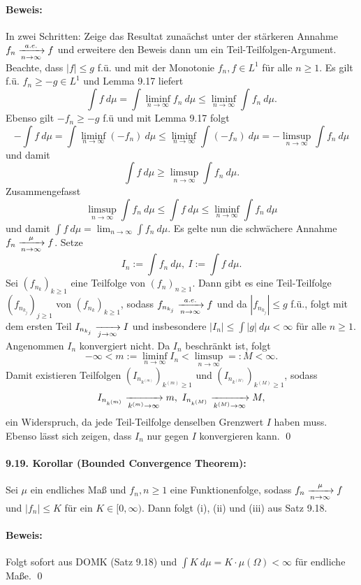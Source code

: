 \paragraph{Beweis:}In zwei Schritten: Zeige das Resultat zuna\"achst unter der st\"arkeren Annahme $f_n\nto{a.e.}{n\to\infty}f$ und erweitere den Beweis dann um ein Teil-Teilfolgen-Argument. Beachte, dass $|f|\leq g$ f.\"u. und mit der Monotonie $f_n,f\in L^1$ f\"ur alle $n\geq1$. Es gilt f.\"u. $f_n\geq -g\in L^1$ und Lemma 9.17 liefert
$$\int f\ d\mu=\int\liminf_{n\to\infty}f_n\ d\mu \leq \liminf_{n\to\infty}\int f_n\ d \mu.$$
Ebenso gilt $-f_n\geq -g$ f.\"u und mit Lemma 9.17 folgt
$$-\int f\ d\mu=\int\liminf_{n\to\infty}(-f_n)\ d\mu\leq\liminf_{n\to\infty}\int (-f_n)\ d\mu=-\limsup_{n\to\infty}\int f_n\ d\mu$$
und damit
$$\int f\ d\mu\geq \limsup_{n\to\infty}\int f_n\ d\mu.$$
Zusammengefasst
$$ \limsup_{n\to\infty}\int f_n\ d\mu\leq\int f\ d\mu\leq  \liminf_{n\to\infty}\int f_n\ d\mu$$
und damit $\int f\ d\mu=\lim_{n\to\infty}\int f_n\ d\mu$. Es gelte nun die schw\"achere Annahme $f_n\nto{\mu}{n\to\infty}f$. Setze
$$I_n:=\int f_n\ d\mu,\ I:=\int f\ d\mu.$$
Sei $(f_{n_k})_{k\geq1}$ eine Teilfolge von $(f_n)_{n\geq1}$. Dann gibt es eine Teil-Teilfolge $(f_{n_{k_j}})_{j\geq1}$ von $(f_{n_k})_{k\geq1}$, sodass $f_{n_{k_j}}\nto{a.e.}{n\to\infty}f$ und da $|f_{n_{k_j}}|\leq g$ f.\"u., folgt mit dem ersten Teil $I_{n_{k_j}}\nto{}{j\to\infty}I$ und insbesondere $|I_n|\leq\int|g|\ d\mu<\infty$ f\"ur alle $n\geq1$. Angenommen $I_n$ konvergiert nicht. Da $I_n$ beschr\"ankt ist, folgt
$$-\infty<m:=\liminf_{n\to\infty}I_n<\limsup_{n\to\infty}=:M<\infty.$$ 
Damit existieren Teilfolgen $(I_{n_{k^{(m)}}})_{k^{(m)}\geq1}$ und $(I_{n_{k^{(M)}}})_{k^{(M)}\geq1}$, sodass
$$I_{n_{k^{(m)}}}\nto{}{k^{(m)}\to\infty}m, \ I_{n_{k^{(M)}}}\nto{}{k^{(M)}\to\infty}M,$$ 
ein Widerspruch, da jede Teil-Teilfolge denselben Grenzwert $I$ haben muss. Ebenso l\"asst sich zeigen, dass $I_n$ nur gegen $I$ konvergieren kann. \qed

\paragraph{9.19. Korollar (Bounded Convergence Theorem):}Sei $\mu$ ein endliches Ma\ss{} und $f_n,n\geq1$ eine Funktionenfolge, sodass $f_n\nto{\mu}{n\to\infty}f$ und $|f_n|\leq K$ f\"ur ein $K\in[0,\infty)$. Dann folgt (i), (ii) und (iii) aus Satz 9.18.

\paragraph{Beweis:}Folgt sofort aus DOMK (Satz 9.18) und $\int K\ d\mu=K\cdot\mu(\Omega)<\infty$ f\"ur endliche Ma\ss{}e. \qed

